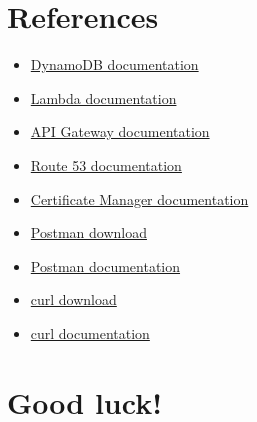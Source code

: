 \documentclass{article}
\begin{document}
\section{References}\label{references}
\begin{itemize}
  \item \href{https://docs.aws.amazon.com/amazondynamodb/latest/developerguide/Introduction.html}{DynamoDB documentation}
  \item \href{https://docs.aws.amazon.com/lambda/latest/dg/welcome.html}{Lambda documentation}
  \item \href{https://docs.aws.amazon.com/apigateway/latest/developerguide/welcome.html}{API Gateway documentation}
  \item \href{https://docs.aws.amazon.com/Route53/latest/DeveloperGuide/Welcome.html}{Route 53 documentation}
  \item \href{https://docs.aws.amazon.com/acm/latest/userguide/acm-overview.html}{Certificate Manager documentation}
  \item \href{https://www.postman.com/downloads/}{Postman download}
  \item \href{https://learning.postman.com/docs/getting-started/introduction/}{Postman documentation}
  \item \href{https://curl.se/download.html}{curl download}
  \item \href{https://curl.se/docs/manual.html}{curl documentation}
\end{itemize}

\section*{Good luck!}
\end{document}
